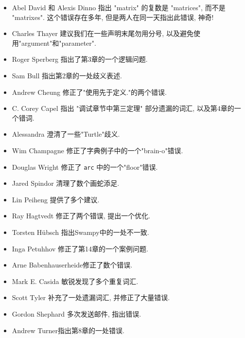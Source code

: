 \documentclass[10pt]{book}
\begin{document}
\begin{itemize}
\item Abel David 和 Alexis Dinno 指出 "matrix" 的复数是 "matrices", 
而不是 "matrixes". 这个错误存在多年, 但是两人在同一天指出此错误, 神奇!

\item Charles Thayer 建议我们在一些声明末尾勿用分号, 以及避免使用"argument"和"parameter". 

\item Roger Sperberg 指出了第3章的一个逻辑问题. 

\item Sam Bull 指出第2章的一处歧义表述. 

\item Andrew Cheung 修正了"使用先于定义."的两个错误.

\item C. Corey Capel 指出 "调试章节中第三定理" 部分遗漏的词汇, 
以及第4章的一个错词. 

\item Alessandra 澄清了一些"Turtle"歧义. 

\item Wim Champagne 修正了字典例子中的一个"brain-o"错误. 

\item Douglas Wright 修正了 {\tt arc} 中的一个"floor"错误. 

\item Jared Spindor 清理了数个画蛇添足. 

\item Lin Peiheng 提供了多个建议. 

\item Ray Hagtvedt 修正了两个错误, 提出一个优化. 

\item Torsten H\"{u}bsch 指出Swampy中的一处不一致. 

\item Inga Petuhhov 修正了第14章的一个案例问题. 

\item Arne Babenhauserheide修正了数个错误. 

\item Mark E. Casida 敏锐发现了多个重复词汇. 

\item Scott Tyler 补充了一处遗漏词汇, 并修正了大量错误. 

\item Gordon Shephard 多次发送邮件, 指出错误. 

\item Andrew Turner指出第8章的一处错误. 


\end{itemize}
\end{document}
